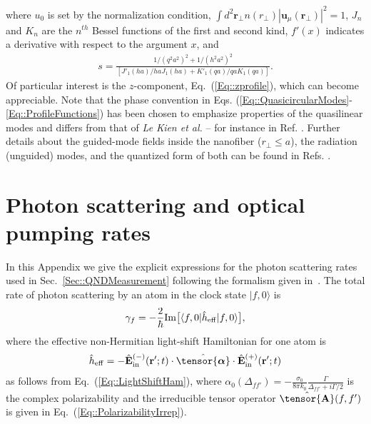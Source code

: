 \documentclass[preprint, aps,pra,onecolumn]{revtex4-1} %
\def\br{\mathbf{r}}
\def\bra#1{\langle{#1}\rvert}%
\def\ket#1{\lvert{#1}\rangle}%
\newcommand{\erf}[1]{Eq.~(\ref{#1})}
\newcommand{\mbf}[1]{\mathbf{#1}}
\newcommand{\poltens}{\hat{\tensor{\boldsymbol{\alpha}}}}
\newcommand{\charpol}{\alpha_0(\Delta_{f\!f'})}
\begin{document}
\begin{appendix}
where $u_0$ is set by the normalization condition, $\int d^2 \mathbf{r}_\perp n(r_\perp) | \mathbf{u}_\mu(\br_\perp)|^2=1$, $J_n$ and $K_n$ are the $n^{th}$ Bessel functions of the first and second kind, $f'(x)$ indicates a derivative with respect to the argument $x$, and 
	\begin{align}
		s = \frac{1/(q^2 a^2)^{2} + 1/(h^2 a^2)^{2}}{[J'_1(ha)/haJ_1(ha) + K'_1(qa)/qaK_1(qa)]}.
	\end{align}  
Of particular interest is the $z$-component, \erf{Eq::zprofile}, which can become appreciable.  Note that the phase convention in Eqs. (\ref{Eq::QuasicircularModes}-\ref{Eq::ProfileFunctions}) has been chosen to emphasize properties of the quasilinear modes and differs from that of \emph{Le Kien et al.} -- for instance in Ref. \cite{le_kien_propagation_2014}.  
Further details about the guided-mode fields inside the nanofiber ($r_\perp\leq a$), the radiation (unguided) modes, and the quantized form of both can be found in Refs. \cite{sondergaard_general_2001, tong_single-mode_2004, kien_field_2004, le_kien_spontaneous_2005, vetsch_eugen_optical_2010}.


\section{Photon scattering and optical pumping rates} \label{Appendix::Rates}	

In this Appendix we give the explicit expressions for the photon scattering rates used in Sec.~\ref{Sec::QNDMeasurement} following the formalism given in~\cite{deutsch_quantum_2010}.  The total rate of photon scattering by an atom in the clock state $\ket{f,0}$ is
	\begin{equation}\label{Eq::gammaf}
		\gamma_{f}=- \frac{2}{\hbar} {\rm Im} \big[ \bra{f,0} \hat{h}_{\rm eff}\ket{f,0} \big] ,
	\end{equation}
where the effective non-Hermitian light-shift Hamiltonian for one atom is 
\begin{align}
\hat{h}_{\rm eff} = - \hat{\mathbf{E}}^{(-)}_{\rm in}(\mathbf{r}' ; t ) \cdot \poltens \cdot \hat{\mathbf{E}}^{(+)}_{\rm in}(\mathbf{r}' ;t )
\end{align}
as follows from \erf{Eq::LightShiftHam}, where $\charpol = -\frac{\sigma_0}{8\pi k_0}\frac{\Gamma}{\Delta_{ff'}+i\Gamma/2}$ is the complex polarizability and the irreducible tensor operator $ \hat{\tensor{\mbf{A}}}(f,f') $ is given in \erf{Eq::PolarizabilityIrrep}.



\end{appendix}
\end{document}
